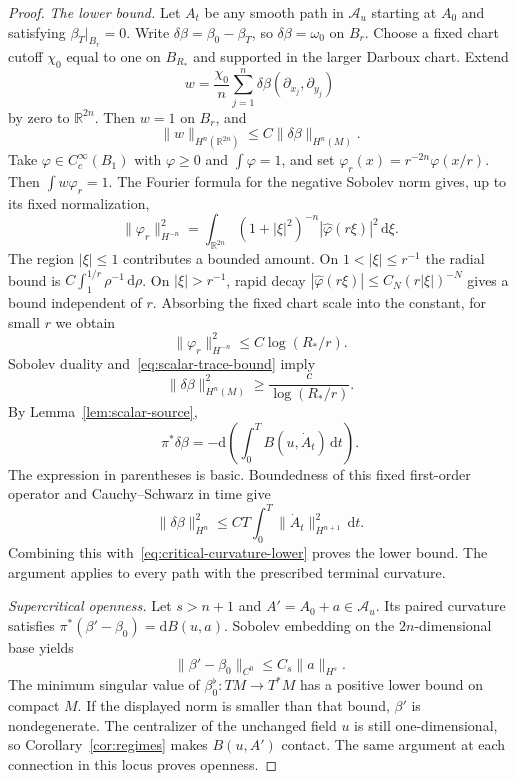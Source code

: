 \documentclass[10pt,a4paper]{amsart}
\newcommand{\R}{\mathbb R}
\newcommand{\dd}{\mathrm d}
\begin{document}
\begin{proof}
\smallskip\noindent
\emph{The lower bound.}
Let $A_t$ be any smooth path in $\mathcal A_u$ starting at $A_0$ and
satisfying $\beta_T|_{B_r}=0$. Write
$\delta\beta=\beta_0-\beta_T$, so $\delta\beta=\omega_0$ on $B_r$.
Choose a fixed chart cutoff $\chi_0$ equal to one on $B_{R_*}$ and supported
in the larger Darboux chart. Extend
\[
 w=\frac{\chi_0}{n}\sum_{j=1}^n
                  \delta\beta(\partial_{x_j},\partial_{y_j})
\]
by zero to $\R^{2n}$. Then $w=1$ on $B_r$, and
\begin{equation}\label{eq:scalar-trace-bound}
 \|w\|_{H^n(\R^{2n})}\leq C\|\delta\beta\|_{H^n(M)}.
\end{equation}
Take $\varphi\in C_c^\infty(B_1)$ with $\varphi\geq0$ and
$\int\varphi=1$, and set
$\varphi_r(x)=r^{-2n}\varphi(x/r)$. Then $\int w\varphi_r=1$.
The Fourier formula for the negative Sobolev norm gives, up to its fixed
normalization,
\[
 \|\varphi_r\|_{H^{-n}}^2
 =\int_{\R^{2n}}(1+|\xi|^2)^{-n}
                         |\widehat\varphi(r\xi)|^2\,\dd\xi.
\]
The region $|\xi|\leq1$ contributes a bounded amount. On
$1<|\xi|\leq r^{-1}$ the radial bound is
$C\int_1^{1/r}\rho^{-1}\,\dd\rho$. On $|\xi|>r^{-1}$, rapid decay
$|\widehat\varphi(r\xi)|\leq C_N(r|\xi|)^{-N}$ gives a bound independent
of $r$. Absorbing the fixed chart scale into the constant, for small $r$ we
obtain
\begin{equation}\label{eq:critical-dual-bump}
 \|\varphi_r\|_{H^{-n}}^2\leq C\log(R_*/r).
\end{equation}
Sobolev duality and~\eqref{eq:scalar-trace-bound} imply
\begin{equation}\label{eq:critical-curvature-lower}
 \|\delta\beta\|_{H^n(M)}^2\geq\frac{c}{\log(R_*/r)}.
\end{equation}
By Lemma~\ref{lem:scalar-source},
\[
 \pi^*\delta\beta
 =-\dd\!\left(\int_0^T B(u,\dot A_t)\,\dd t\right).
\]
The expression in parentheses is basic. Boundedness of this fixed
first-order operator and Cauchy--Schwarz in time give
\[
 \|\delta\beta\|_{H^n}^2
 \leq CT\int_0^T\|\dot A_t\|_{H^{n+1}}^2\,\dd t.
\]
Combining this with~\eqref{eq:critical-curvature-lower} proves the lower
bound. The argument applies to every path with the prescribed terminal curvature.

\smallskip\noindent
\emph{Supercritical openness.}
Let $s>n+1$ and $A'=A_0+a\in\mathcal A_u$. Its paired curvature satisfies
$\pi^*(\beta'-\beta_0)=\dd B(u,a)$. Sobolev embedding on the
$2n$-dimensional base yields
\[
 \|\beta'-\beta_0\|_{C^0}\leq C_s\|a\|_{H^s}.
\]
The minimum singular value of
$\beta_0^\flat:TM\to T^*M$ has a positive lower bound on compact $M$.
If the displayed norm is smaller than that bound, $\beta'$ is nondegenerate.
The centralizer of the unchanged field $u$ is still one-dimensional, so
Corollary~\ref{cor:regimes} makes $B(u,A')$ contact. The same argument at
each connection in this locus proves openness.
\end{proof}
\end{document}
